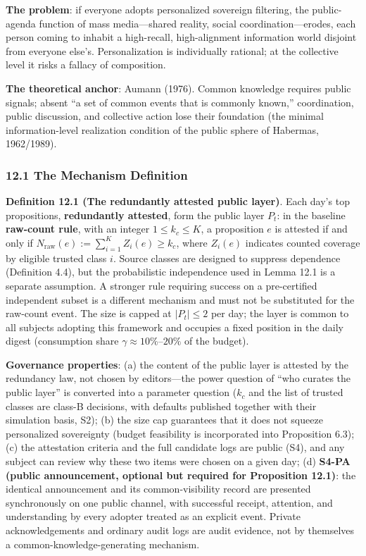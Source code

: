 \documentclass[
  11pt]{article}
\begin{document}
\textbf{The problem}: if everyone adopts personalized sovereign
filtering, the public-agenda function of mass media---shared reality,
social coordination---erodes, each person coming to inhabit a
high-recall, high-alignment information world disjoint from everyone
else's. Personalization is individually rational; at the collective
level it risks a fallacy of composition.

\textbf{The theoretical anchor}: Aumann (1976). Common knowledge
requires public signals; absent ``a set of common events that is
commonly known,'' coordination, public discussion, and collective action
lose their foundation (the minimal information-level realization
condition of the public sphere of Habermas, 1962/1989).

\subsubsection{12.1 The Mechanism
Definition}\label{the-mechanism-definition}

\textbf{Definition 12.1 (The redundantly attested public layer)}. Each
day's top propositions, \textbf{redundantly attested}, form the public
layer \(P_t\): in the baseline \textbf{raw-count rule}, with an integer
\(1\le k_c\le K\), a proposition \(e\) is attested if and only if
\(N_{\mathrm{raw}}(e):=\sum_{i=1}^K Z_i(e)\ge k_c\), where \(Z_i(e)\)
indicates counted coverage by eligible trusted class \(i\). Source
classes are designed to suppress dependence (Definition 4.4), but the
probabilistic independence used in Lemma 12.1 is a separate assumption.
A stronger rule requiring success on a pre-certified independent subset
is a different mechanism and must not be substituted for the raw-count
event. The size is capped at \(|P_t| \le 2\) per day; the layer is
common to all subjects adopting this framework and occupies a fixed
position in the daily digest (consumption share
\(\gamma \approx 10\%\)--\(20\%\) of the budget).

\textbf{Governance properties}: (a) the content of the public layer is
attested by the redundancy law, not chosen by editors---the power
question of ``who curates the public layer'' is converted into a
parameter question (\(k_c\) and the list of trusted classes are class-B
decisions, with defaults published together with their simulation basis,
S2); (b) the size cap guarantees that it does not squeeze personalized
sovereignty (budget feasibility is incorporated into Proposition 6.3);
(c) the attestation criteria and the full candidate logs are public
(S4), and any subject can review why these two items were chosen on a
given day; (d) \textbf{S4-PA (public announcement, optional but required
for Proposition 12.1)}: the identical announcement and its
common-visibility record are presented synchronously on one public
channel, with successful receipt, attention, and understanding by every
adopter treated as an explicit event. Private acknowledgements and
ordinary audit logs are audit evidence, not by themselves a
common-knowledge-generating mechanism.
\end{document}

